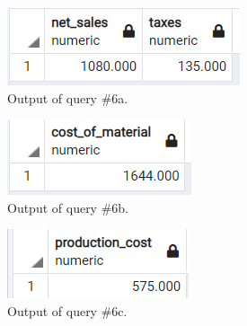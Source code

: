 \begin{figure}[h!]
	\centering
	\begin{subfigure}{0.3\linewidth}
		\includegraphics[width=\linewidth]{images/q6_a}
		\caption{Output of query \#6a.}
		\label{fig:q6a}
	\end{subfigure}
	\hfill
	\begin{subfigure}{0.3\linewidth}
		\includegraphics[width=\linewidth]{images/q6_b}
		\caption{Output of query \#6b.}
		\label{fig:q6b}
	\end{subfigure}
	\hfill
	\begin{subfigure}{0.3\linewidth}
		\includegraphics[width=\linewidth]{images/q6_c}
		\caption{Output of query \#6c.}
		\label{fig:q6c}
	\end{subfigure}
	\caption{}
\end{figure}

